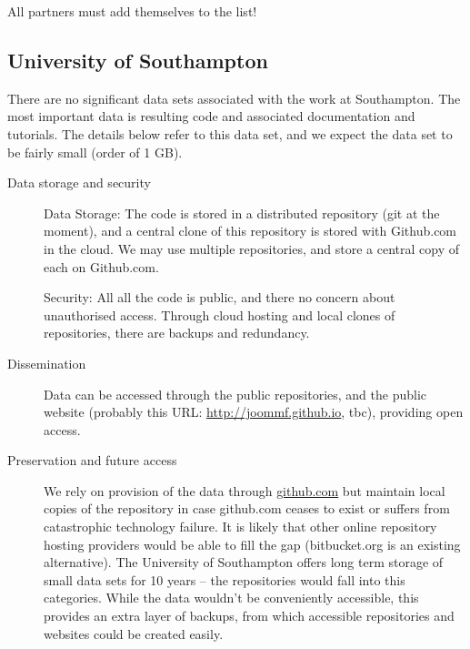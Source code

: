\documentclass[12pt]{amsbook}
\begin{document}
All partners must add themselves to the list!


\subsection{University of Southampton}

There are no significant data sets associated with the work at Southampton. The most important data is resulting code and associated documentation and tutorials. The details below refer to this data set, and we expect the data set to be fairly small (order of 1 GB).
\begin{description}
\item[Data storage and security] Data Storage: The code is stored in a distributed repository (git at the moment), and a central clone of this repository is stored with Github.com in the cloud. We may use multiple repositories, and store a central copy of each on Github.com.

  Security: All all the code is public, and there no concern about unauthorised access. Through cloud hosting and local clones of repositories, there are backups and redundancy.
\item[Dissemination] Data can be accessed through the public repositories, and the public website (probably this URL: \href{http://joommf.github.io}{http://joommf.github.io}, tbc), providing open access.
\item[Preservation and future access] We rely on provision of the data through \href{github.com}{github.com} but maintain local copies of the repository in case github.com ceases to exist or suffers from catastrophic technology failure. It is likely that other online repository hosting providers would be able to fill the gap (bitbucket.org is an existing alternative). The University of Southampton offers long term storage of small data sets for 10 years -- the repositories would fall into this categories. While the data wouldn't be conveniently accessible, this provides an extra layer of backups, from which accessible repositories and websites could be created easily.
\end{description}
\end{document}
